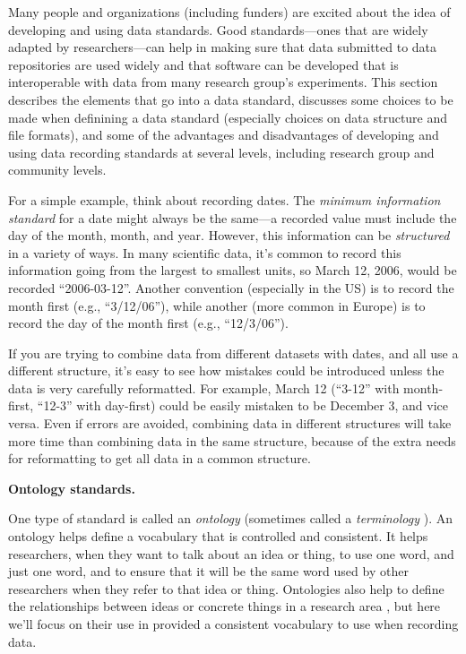 \documentclass[]{tufte-book}
\begin{document}
Many people and organizations (including funders) are excited about the idea of
developing and using data standards. Good standards---ones that are widely
adapted by researchers---can help in making sure that data submitted to data
repositories are used widely and that software can be developed that is
interoperable with data from many research group's experiments. This section
describes the elements that go into a data standard, discusses some choices to
be made when definining a data standard (especially choices on data structure
and file formats), and some of the advantages and disadvantages of developing
and using data recording standards at several levels, including research group
and community levels.

For a simple example, think about recording dates. The \emph{minimum
information standard} for a date might always be the same---a recorded value
must include the day of the month, month, and year. However, this information
can be \emph{structured} in a variety of ways. In many scientific data, it's common
to record this information going from the largest to smallest units, so March
12, 2006, would be recorded ``2006-03-12''. Another convention (especially in the
US) is to record the month first (e.g., ``3/12/06''), while another (more common
in Europe) is to record the day of the month first (e.g., ``12/3/06'').

If you are trying to combine data from different datasets with dates, and all
use a different structure, it's easy to see how mistakes could be introduced
unless the data is very carefully reformatted. For example, March 12 (``3-12''
with month-first, ``12-3'' with day-first) could be easily mistaken to be December
3, and vice versa. Even if errors are avoided, combining data in different
structures will take more time than combining data in the same structure,
because of the extra needs for reformatting to get all data in a common
structure.

\textbf{Ontology standards.}

One type of standard is called an \emph{ontology} (sometimes called a \emph{terminology}
\citep{sansone2012toward}). An ontology helps define a vocabulary that is controlled
and consistent. It helps researchers, when they want to talk
about an idea or thing, to use one word, and just one word, and to ensure that
it will be the same word used by other researchers when they refer to that idea
or thing. Ontologies also help to define the relationships between ideas or
concrete things in a research area \citep{ghosh2011software}, but here we'll focus on
their use in provided a consistent vocabulary to use when recording data.
\end{document}
